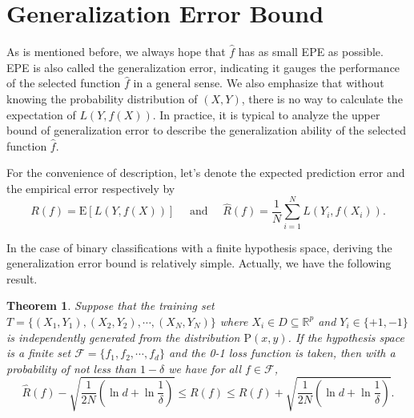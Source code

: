\documentclass{report}
\newtheorem{theorem}{Theorem}[chapter]
\theoremstyle{nonumberplain}
\newcommand{\0}{\mathbf{0}}
\begin{document}
\section{Generalization Error Bound}

As is mentioned before, we always hope that $\hat{f}$ has as small EPE as possible. EPE is also called the generalization error, indicating it gauges the performance of the selected function $\hat{f}$ in a general sense. We also emphasize that without knowing the probability distribution of $(X,Y)$, there is no way to calculate the expectation of $L(Y,f(X))$. In practice, it is typical to analyze the upper bound of generalization error to describe the generalization ability of the selected function $\hat{f}$. 

For the convenience of description, let's denote the expected prediction error and the empirical error respectively by
\[
R(f)=\mathrm{E}[L(Y,f(X))]\quad\text{ and }\quad\widehat{R}(f)=\frac{1}{N} \sum_{i=1}^{N} L\left(Y_{i}, f\left(X_{i}\right)\right).
\]

In the case of binary classifications with a finite hypothesis space, deriving the generalization error bound is relatively simple. Actually, we have the following result.

\begin{theorem}
	Suppose that the training set $T=\{(X_1,Y_1),(X_2,Y_2),\cdots,(X_{N},Y_{N})\}$ where $X_i\in D\subseteq\mathbb{R}^p$ and $Y_i\in\{+1,-1\}$ is  independently generated from the distribution $\mathrm{P}(x,y)$. If the hypothesis space is a finite set $\mathcal{F}=\{f_1,f_2,\cdots,f_d\}$ and the 0-1 loss function is taken, then  with a probability of not less than $1-\delta$ we have for all $f\in \mathcal{F}$,
	\[
	\widehat{R}(f)-\sqrt{\frac{1}{2 N}\left(\ln d+\ln \frac{1}{\delta}\right)}\le R(f) \le \widehat{R}(f)+\sqrt{\frac{1}{2 N}\left(\ln d+\ln \frac{1}{\delta}\right)}.
	\]
\end{theorem}
\end{document}
